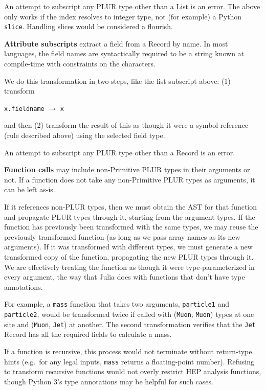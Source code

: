 \documentclass[10pt, conference, compsocconf]{IEEEtran}
\begin{document}
An attempt to subscript any PLUR type other than a List is an error. The above only works if the index resolves to integer type, not (for example) a Python {\tt slice}. Handling slices would be considered a flourish.

{\bf Attribute subscripts} extract a field from a Record by name. In most languages, the field names are syntactically required to be a string known at compile-time with constraints on the characters.

We do this transformation in two steps, like the list subscript above: (1) transform
\begin{center}
{\tt x.fieldname} $\to$ {\tt x}
\end{center}
and then (2) transform the result of this as though it were a symbol reference (rule described above) using the selected field type.

An attempt to subscript any PLUR type other than a Record is an error.

{\bf Function calls} may include non-Primitive PLUR types in their arguments or not. If a function does not take any non-Primitive PLUR types as arguments, it can be left as-is.

If it references non-PLUR types, then we must obtain the AST for that function and propagate PLUR types through it, starting from the argument types. If the function has previously been transformed with the same types, we may reuse the previously transformed function (as long as we pass array names as its new arguments). If it was transformed with different types, we must generate a new transformed copy of the function, propagating the new PLUR types through it. We are effectively treating the function as though it were type-parameterized in every argument, the way that Julia\cite{julia} does with functions that don't have type annotations.

For example, a {\tt mass} function that takes two arguments, {\tt particle1} and {\tt particle2}, would be transformed twice if called with ({\tt Muon}, {\tt Muon}) types at one site and ({\tt Muon}, {\tt Jet}) at another. The second transformation verifies that the {\tt Jet} Record has all the required fields to calculate a mass.

If a function is recursive, this process would not terminate without return-type hints (e.g.\ for any legal inputs, {\tt mass} returns a floating-point number). Refusing to transform recursive functions would not overly restrict HEP analysis functions, though Python 3's type annotations may be helpful for such cases.
\end{document}
